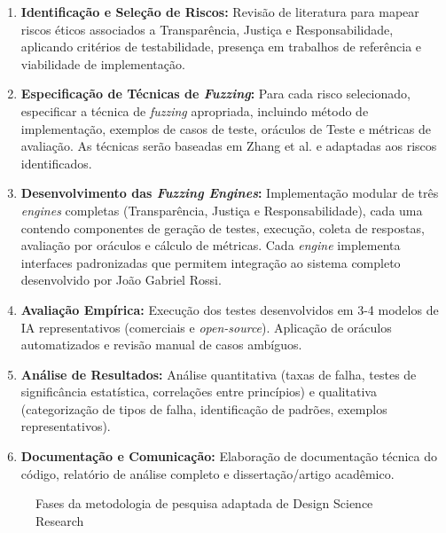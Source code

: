 \begin{enumerate}
    \item \textbf{Identificação e Seleção de Riscos:} Revisão de literatura para mapear riscos éticos associados a Transparência, Justiça e Responsabilidade, aplicando critérios de testabilidade, presença em trabalhos de referência e viabilidade de implementação.
    
    \item \textbf{Especificação de Técnicas de \textit{Fuzzing}:} Para cada risco selecionado, especificar a técnica de \textit{fuzzing} apropriada, incluindo método de implementação, exemplos de casos de teste, oráculos de Teste e métricas de avaliação. As técnicas serão baseadas em Zhang et al. \cite{Zhang2019} e adaptadas aos riscos identificados.
    
    \item \textbf{Desenvolvimento das \textit{Fuzzing Engines}:} Implementação modular de três \textit{engines} completas (Transparência, Justiça e Responsabilidade), cada uma contendo componentes de geração de testes, execução, coleta de respostas, avaliação por oráculos e cálculo de métricas. Cada \textit{engine} implementa interfaces padronizadas que permitem integração ao sistema completo desenvolvido por João Gabriel Rossi.
    
    \item \textbf{Avaliação Empírica:} Execução dos testes desenvolvidos em 3-4 modelos de IA representativos (comerciais e \textit{open-source}). Aplicação de oráculos automatizados e revisão manual de casos ambíguos.
    
    \item \textbf{Análise de Resultados:} Análise quantitativa (taxas de falha, testes de significância estatística, correlações entre princípios) e qualitativa (categorização de tipos de falha, identificação de padrões, exemplos representativos).
    
    \item \textbf{Documentação e Comunicação:} Elaboração de documentação técnica do código, relatório de análise completo e dissertação/artigo acadêmico.
\end{enumerate}

\begin{figure}[htb!]
\centering
\caption{Fases da metodologia de pesquisa adaptada de Design Science Research}
\label{fig:metodologia}
\end{figure}

